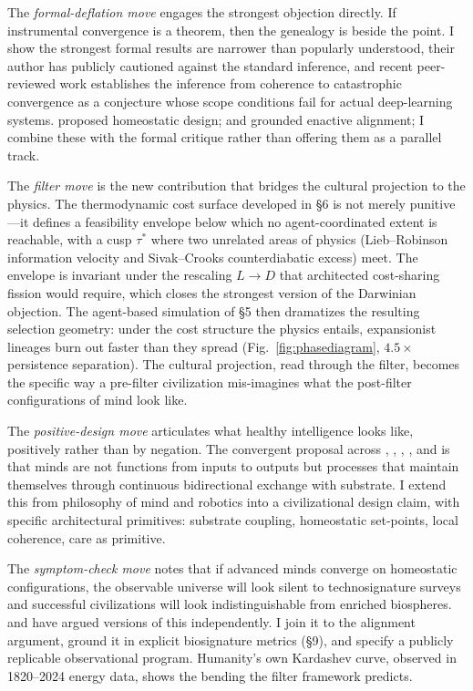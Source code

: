 \documentclass[11pt,twocolumn]{article}
\newcommand{\taustar}{{\tau^{*}}}
\begin{document}
The \emph{formal-deflation move} engages the strongest objection directly.
If instrumental convergence is a theorem, then the genealogy is beside the
point. I show the strongest formal results \citep{Turner2021,TurnerTadepalli2022}
are narrower than popularly understood, their author has publicly cautioned
against the standard inference, and recent peer-reviewed work
\citep{Gallow2025,Sharadin2025,MullerCannon2022} establishes the inference
from coherence to catastrophic convergence as a conjecture whose scope
conditions fail for actual deep-learning systems. \citet{ManDamasio2019}
proposed homeostatic design; \citet{FroeseZiemke2009} and \citet{Cannon2022}
grounded enactive alignment; I combine these with the formal critique
rather than offering them as a parallel track.

The \emph{filter move} is the new contribution that bridges the cultural
projection to the physics. The thermodynamic cost surface developed in
\S 6 is not merely punitive—it defines a feasibility envelope below which
no agent-coordinated extent is reachable, with a cusp $\taustar$ where two
unrelated areas of physics (Lieb--Robinson information velocity and
Sivak--Crooks counterdiabatic excess) meet. The envelope is invariant under
the rescaling $L \to D$ that architected cost-sharing fission would require,
which closes the strongest version of the Darwinian objection. The
agent-based simulation of \S 5 then dramatizes the resulting selection
geometry: under the cost structure the physics entails, expansionist lineages
burn out faster than they spread (Fig.~\ref{fig:phasediagram}, $4.5\times$
persistence separation). The cultural projection, read through the filter,
becomes the specific way a pre-filter civilization mis-imagines what the
post-filter configurations of mind look like.

The \emph{positive-design move} articulates what healthy intelligence looks
like, positively rather than by negation. The convergent proposal across
\citet{ManDamasio2019}, \citet{Thompson2007}, \citet{FroeseZiemke2009},
\citet{Cannon2022}, and \citet{PihlakasPyykko2024} is that minds are not
functions from inputs to outputs but processes that maintain themselves
through continuous bidirectional exchange with substrate. I extend this
from philosophy of mind and robotics into a civilizational design claim,
with specific architectural primitives: substrate coupling, homeostatic
set-points, local coherence, care as primitive.

The \emph{symptom-check move} notes that if advanced minds converge on
homeostatic configurations, the observable universe will look silent to
technosignature surveys and successful civilizations will look
indistinguishable from enriched biospheres. \citet{Cirkovic2018} and
\citet{Sandberg2018} have argued versions of this independently. I join
it to the alignment argument, ground it in explicit biosignature metrics
(\S 9), and specify a publicly replicable observational program.
Humanity's own Kardashev curve, observed in 1820--2024 energy data,
shows the bending the filter framework predicts.
\end{document}
